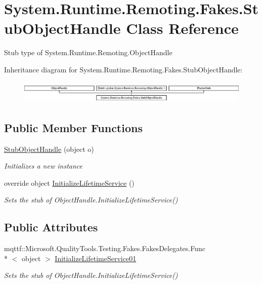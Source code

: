 \hypertarget{class_system_1_1_runtime_1_1_remoting_1_1_fakes_1_1_stub_object_handle}{\section{System.\-Runtime.\-Remoting.\-Fakes.\-Stub\-Object\-Handle Class Reference}
\label{class_system_1_1_runtime_1_1_remoting_1_1_fakes_1_1_stub_object_handle}
}


Stub type of System.\-Runtime.\-Remoting.\-Object\-Handle 


Inheritance diagram for System.\-Runtime.\-Remoting.\-Fakes.\-Stub\-Object\-Handle\-:\begin{figure}[H]
\begin{center}
\leavevmode
\includegraphics[height=1.117764cm]{class_system_1_1_runtime_1_1_remoting_1_1_fakes_1_1_stub_object_handle}
\end{center}
\end{figure}
\subsection*{Public Member Functions}
\begin{DoxyCompactItemize}
\item 
\hyperlink{class_system_1_1_runtime_1_1_remoting_1_1_fakes_1_1_stub_object_handle_a789d6dcb1072080aea95c9ce93eae88c}{Stub\-Object\-Handle} (object o)
\begin{DoxyCompactList}\small\item\em Initializes a new instance\end{DoxyCompactList}\item 
override object \hyperlink{class_system_1_1_runtime_1_1_remoting_1_1_fakes_1_1_stub_object_handle_adce32f7f2b79f79e80ec4de8c737dfd9}{Initialize\-Lifetime\-Service} ()
\begin{DoxyCompactList}\small\item\em Sets the stub of Object\-Handle.\-Initialize\-Lifetime\-Service()\end{DoxyCompactList}\end{DoxyCompactItemize}
\subsection*{Public Attributes}
\begin{DoxyCompactItemize}
\item 
mqttf\-::\-Microsoft.\-Quality\-Tools.\-Testing.\-Fakes.\-Fakes\-Delegates.\-Func\\*
$<$ object $>$ \hyperlink{class_system_1_1_runtime_1_1_remoting_1_1_fakes_1_1_stub_object_handle_a8c98cde3d326e793725ac64251e1dc27}{Initialize\-Lifetime\-Service01}
\begin{DoxyCompactList}\small\item\em Sets the stub of Object\-Handle.\-Initialize\-Lifetime\-Service()\end{DoxyCompactList}\end{DoxyCompactItemize}
